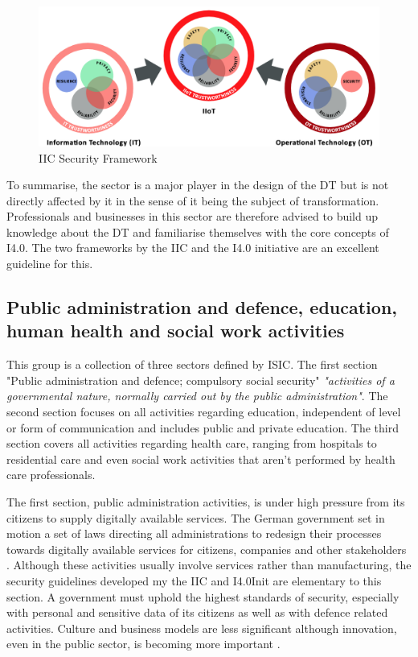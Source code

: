 \begin{figure}[H]
\centering
\includegraphics[width=1\columnwidth]{images/iic-iiot-trustworthiness}
\caption{\ac{IIC} Security Framework}
\end{figure}

To summarise, the sector is a major player in the design of the \ac{DT} but is not directly affected by it in the sense of it being the subject of transformation. Professionals and businesses in this sector are therefore advised to build up knowledge about the \ac{DT} and familiarise themselves with the core concepts of \ac{I4.0}. The two frameworks by the \ac{IIC} and the \ac{I4.0} initiative are an excellent guideline for this.

\subsection{Public administration and defence, education, human health and social work activities}

This group is a collection of  three  sectors  defined  by \ac{ISIC}. The first section "Public administration and defence; compulsory social security" \emph{"activities of a governmental nature, normally carried out by the public administration"}\cite[p.243]{ISIC:2008}. The second section focuses on all activities regarding education, independent of level or form of communication and includes public and private education. The third section covers all activities regarding health care, ranging from hospitals to residential care and even social work activities that aren't performed by health care professionals\cite[p.254ff]{ISIC:2008}.

The first section, public administration activities, is under high pressure from its citizens to supply digitally available services. The German government set in motion a set of laws directing all administrations to redesign their processes towards digitally available services for citizens, companies and other stakeholders \cite{verwaltung:2014}. Although these activities usually involve services rather than manufacturing, the security guidelines developed my the \ac{IIC} and \ac{I4.0Init} are elementary to this section. A government must uphold the highest standards of security, especially with personal and sensitive data of its citizens as well as with defence related activities. Culture and business models are less significant although innovation, even in the public sector, is becoming more important \cite{derivwhitehouse:2016}. 

